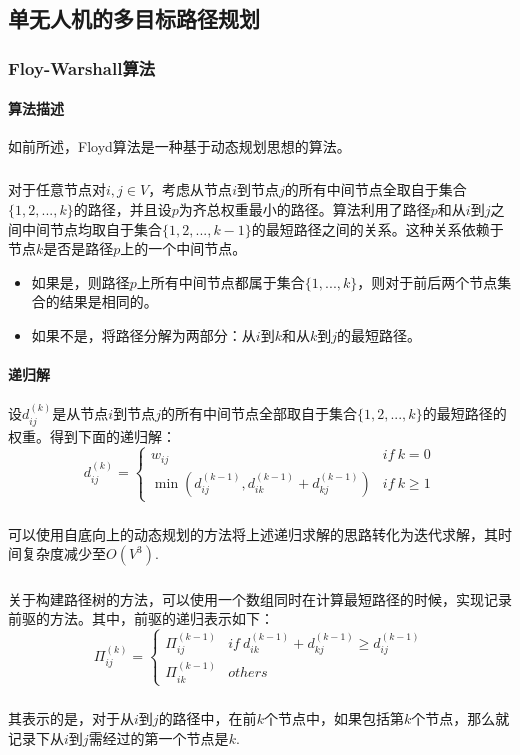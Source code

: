 \documentclass[UTF8,a4paper]{ctexart}
\begin{document}
\subsection{单无人机的多目标路径规划}\label{sec:solutionTSP}

\subsubsection{Floy-Warshall算法}\label{sec:floydsolution}
\paragraph{算法描述}如前所述，Floyd算法是一种基于动态规划思想的算法。
\subparagraph{}对于任意节点对$i,j\in V$，考虑从节点$i$到节点$j$的所有中间节点全取自于集合$\{1,2,...,k\}$的路径，并且设$p$为齐总权重最小的路径。算法利用了路径$p$和从$i$到$j$之间中间节点均取自于集合$\{1,2,...,k-1\}$的最短路径之间的关系。这种关系依赖于节点$k$是否是路径$p$上的一个中间节点。
\begin{itemize}
    \item 如果是，则路径$p$上所有中间节点都属于集合$\{1,...,k\}$，则对于前后两个节点集合的结果是相同的。
    \item 如果不是，将路径分解为两部分：从$i$到$k$和从$k$到$j$的最短路径。
\end{itemize}
\paragraph{递归解}设$d_{ij}^{(k)}$是从节点$i$到节点$j$的所有中间节点全部取自于集合$\{1,2,...,k\}$的最短路径的权重。得到下面的递归解：
\[
    d_{ij}^{(k)}=\begin{cases}
        w_{ij}                                             & if~ k=0     \\
        \min(d_{ij}^{(k-1)},d_{ik}^{(k-1)}+d_{kj}^{(k-1)}) & if~ k\geq 1
    \end{cases}
\]
\subparagraph{}可以使用自底向上的动态规划的方法将上述递归求解的思路转化为迭代求解，其时间复杂度减少至$O(V^3)$.
\subparagraph{}关于构建路径树的方法，可以使用一个数组同时在计算最短路径的时候，实现记录前驱的方法。其中，前驱的递归表示如下：
\[
    \Pi_{ij}^{(k)}=\begin{cases}
        \Pi_{ij}^{(k-1)} & if~ d_{ik}^{(k-1)}+d_{kj}^{(k-1)} \geq d_{ij}^{(k-1)} \\
        \Pi_{ik}^{(k-1)} & others
    \end{cases}
\]
\subparagraph{}其表示的是，对于从$i$到$j$的路径中，在前$k$个节点中，如果包括第$k$个节点，那么就记录下从$i$到$j$需经过的第一个节点是$k$.
\end{document}
